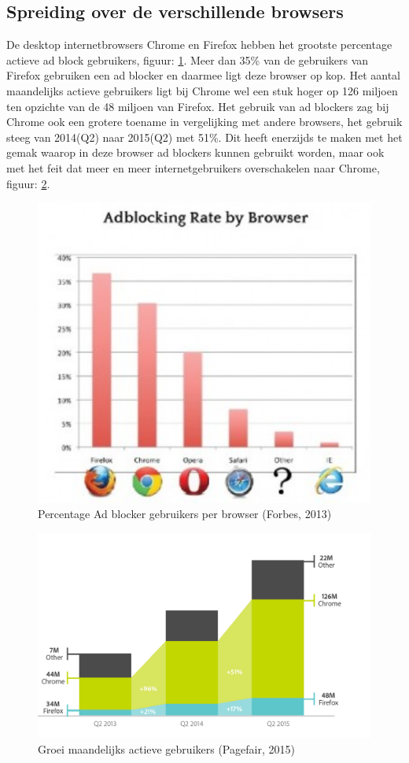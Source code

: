 \documentclass[pdftex,a4paper,12pt,twoside]{report}
\begin{document}
\subsection{Spreiding over de verschillende browsers}
\label{sec spreiding over de verschillende browsers}
De desktop internetbrowsers Chrome en Firefox hebben het grootste percentage actieve ad block gebruikers, figuur: \ref{fig: Ad-blocking-by-browse}. Meer dan 35\% van de gebruikers van Firefox gebruiken een ad blocker en daarmee ligt deze browser op kop. Het aantal maandelijks actieve gebruikers ligt bij Chrome wel een stuk hoger op 126 miljoen ten opzichte van de 48 miljoen van Firefox. Het gebruik van ad blockers zag bij Chrome ook een grotere toename in vergelijking met andere browsers, het gebruik steeg van 2014(Q2) naar 2015(Q2) met 51\%. Dit heeft enerzijds te maken met het gemak waarop in deze browser ad blockers kunnen gebruikt worden, maar ook met het feit dat meer en meer internetgebruikers overschakelen naar Chrome, figuur: \ref{fig: UsersPerBrowser}.
\begin{figure}[h!]
\centering
\includegraphics[width=12cm]{img/Ad-blocking-by-browse}
\caption{Percentage Ad blocker gebruikers per browser (Forbes, 2013)}
\label{fig: Ad-blocking-by-browse}
\end{figure}

\begin{figure}[h!]
\centering
\includegraphics[width=12cm]{img/UsersPerBrowser}
\caption{Groei maandelijks actieve gebruikers (Pagefair, 2015)}
\label{fig: UsersPerBrowser}
\end{figure}
\end{document}
